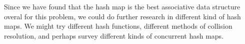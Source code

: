 \documentclass[12pt,a4paper]{article}
\begin{document}
    Since we have found that the hash map is the best associative data structure overal for this
    problem, we could do further research in different kind of hash maps. We might try different
    hash functions, different methods of collision resolution, and perhaps survey different kinds of
    concurrent hash maps.

    

    
\end{document}
